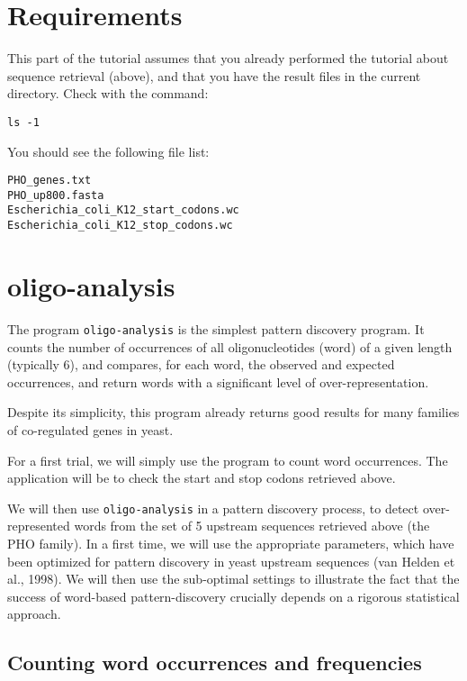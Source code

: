 \section{Requirements}
This part of the tutorial assumes that you already performed the
tutorial about sequence retrieval (above), and that you have the
result files in the current directory. Check with the command:

\begin{verbatim}
ls -1
\end{verbatim}

You should see the following file list:
\begin{verbatim}
PHO_genes.txt
PHO_up800.fasta
Escherichia_coli_K12_start_codons.wc
Escherichia_coli_K12_stop_codons.wc
\end{verbatim}

\section{oligo-analysis}

The program \texttt{oligo-analysis} is the simplest pattern discovery
program. It counts the number of occurrences of all oligonucleotides
(word) of a given length (typically 6), and compares, for each word,
the observed and expected occurrences, and return words with a
significant level of over-representation.  

Despite its simplicity, this program already returns good results for
many families of co-regulated genes in yeast.

For a first trial, we will simply use the program to count word
occurrences. The application will be to check the start and stop
codons retrieved above.

We will then use \texttt{oligo-analysis} in a pattern discovery
process, to detect over-represented words from the set of 5 upstream
sequences retrieved above (the PHO family).  In a first time, we will
use the appropriate parameters, which have been optimized for pattern
discovery in yeast upstream sequences (van Helden et al., 1998). We
will then use the sub-optimal settings to illustrate the fact that the
success of word-based pattern-discovery crucially depends on a
rigorous statistical approach.

\subsection{Counting word occurrences and frequencies}

